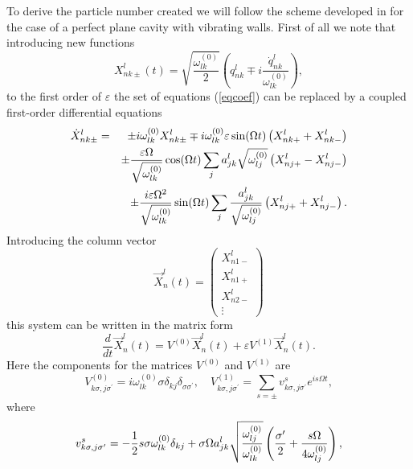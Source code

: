\documentclass[a4paper,11pt]{article}
\begin{document}
To derive the particle number created we will follow the scheme developed in
\cite{Ji} for the case of a perfect plane cavity with vibrating walls.
First of all we note that introducing new functions
\begin{equation}
X_{nk\pm }^{l}(t)=\sqrt{\frac{\omega _{lk}^{(0)}}{2}}\left( q_{nk}^{l}\mp i%
\frac{\dot{q}_{nk}^{l}}{\omega _{lk}^{(0)}}\right) ,  \label{newX}
\end{equation}
to the first order of $\varepsilon $ the set of equations (\ref{eqcoef}) can
be replaced by a coupled first-order differential equations
\begin{eqnarray}
\dot{X}_{nk\pm }^{l} &=&\pm i\omega _{lk}^{(0)}X_{nk\pm }^{l}\mp i\omega
_{lk}^{(0)}\varepsilon \sin (\Omega t)\left( X_{nk+}^{l}+X_{nk-}^{l}\right)
\label{eqcoef4} \\
& & \pm \frac{\varepsilon \Omega }{\sqrt{\omega _{lk}^{(0)}}}\cos
(\Omega t)\sum_{j}a_{jk}^{l}\sqrt{\omega _{lj}^{(0)}}\left(
X_{nj+}^{l}-X_{nj-}^{l}\right) \nonumber \\
& & \pm \frac{i\varepsilon \Omega ^{2}}{\sqrt{%
\omega _{lk}^{(0)}}}\sin (\Omega t)\sum_{j}\frac{a_{jk}^{l}}{\sqrt{\omega
_{lj}^{(0)}}}\left( X_{nj+}^{l}+X_{nj-}^{l}\right) .  \nonumber
\end{eqnarray}
Introducing the column vector
\begin{equation}
{\vec{X}}_{n}^{l}(t)=\left(
\begin{array}{c}
X_{n1-}^{l} \\
X_{n1+}^{l} \\
X_{n2-}^{l} \\
\vdots
\end{array}
\right)   \label{Xvec}
\end{equation}
this system can be written in the matrix form
\begin{equation}
\frac{d}{dt}{\vec{X}}_{n}^{l}(t)=V^{(0)}{\vec{X}}_{n}^{l}(t)+\varepsilon
V^{(1)}{\vec{X}}_{n}^{l}(t).  \label{matrixeq}
\end{equation}
Here the components for the matrices $V^{(0)}$ and $V^{(1)}$ are
\begin{equation}
V_{k\sigma ,j\sigma ^{\prime }}^{(0)}=i\omega _{lk}^{(0)}\sigma \delta
_{kj}\delta _{\sigma \sigma ^{\prime }},\quad V_{k\sigma ,j\sigma ^{\prime
}}^{(1)}=\sum_{s=\pm }v_{k\sigma ,j\sigma ^{\prime }}^{s}e^{is\Omega t},
\label{V0V1}
\end{equation}
where
\begin{equation}
v_{k\sigma ,j\sigma ^{\prime }}^{s}=-\frac{1}{2}s\sigma \omega
_{lk}^{(0)}\delta _{kj}+\sigma \Omega a_{jk}^{l}\sqrt{\frac{\omega
_{lj}^{(0)}}{\omega _{lk}^{(0)}}}\left( \frac{\sigma ^{\prime }}{2}+\frac{%
s\Omega }{4\omega _{lj}^{(0)}}\right) ,  \label{vs}
\end{equation}
\end{document}
